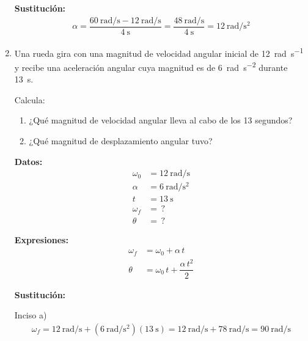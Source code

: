 \documentclass[14pt]{extarticle}
\begin{document}
\begin{enumerate}
\textbf{Sustitución:}
\begin{align*}
\alpha = \dfrac{\displaystyle \SI[per-mode=fraction]{60}{\radian\per\second} - \SI[per-mode=fraction]{12}{\radian\per\second}}{\SI{4}{\second}} = \dfrac{\displaystyle \SI[per-mode=fraction]{48}{\radian\per\second}}{\SI{4}{\second}} = \SI[per-mode=fraction]{12}{\radian\per\square\second}
\end{align*}
\item Una rueda gira con una magnitud de velocidad angular inicial de \SI{12}{\radian\per\second} y recibe una aceleración angular cuya magnitud es de \SI{6}{\radian\per\square\second} durante \SI{13}{\second}.

Calcula:
\begin{enumerate}[label=\alph*)]
\item ¿Qué magnitud de velocidad angular lleva al cabo de los \num{13} segundos?
\item ¿Qué magnitud de desplazamiento angular tuvo?
\end{enumerate}

\begin{minipage}[t]{0.4\linewidth}
\textbf{Datos:}
\begin{align*}
\omega_{0} &= \SI{12}{\radian\per\second} \\
\alpha &= \SI{6}{\radian\per\square\second} \\
t &= \SI{13}{\second} \\
\omega_{f} &= \, ? \\
\theta &= \, ?
\end{align*}
\end{minipage}
\begin{minipage}[t]{0.4\linewidth}
\textbf{Expresiones:}
\begin{align*}
\omega_{f} &= \omega_{0} + \alpha \, t \\
\theta &= \omega_{0} \, t + \dfrac{\alpha \, t^{2}}{2}
\end{align*}
\end{minipage}

\textbf{Sustitución:}

Inciso a)
\begin{align*}
\omega_{f} = \SI[per-mode=fraction]{12}{\radian\per\second} + \left( \SI[per-mode=fraction]{6}{\radian\per\square\second} \right) \left( \SI{13}{\second} \right) = \SI[per-mode=fraction]{12}{\radian\per\second} + \SI[per-mode=fraction]{78}{\radian\per\second} = \SI[per-mode=fraction]{90}{\radian\per\second}
\end{align*}


\end{enumerate}
\end{document}
